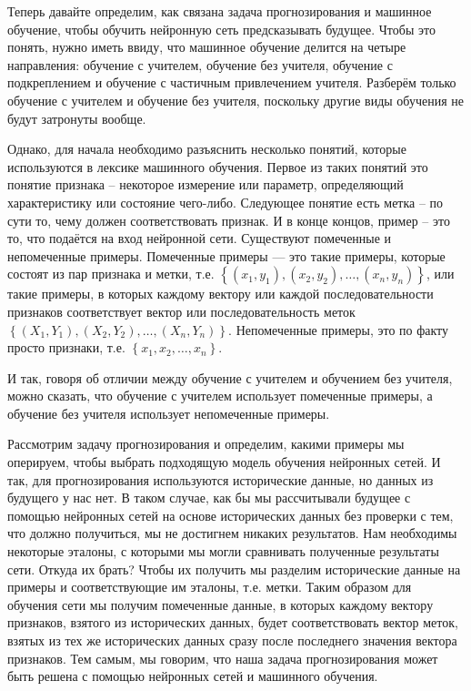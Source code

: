 {  \par Теперь давайте определим, как связана задача прогнозирования и машинное обучение, чтобы обучить нейронную сеть предсказывать будущее. Чтобы это понять, нужно иметь ввиду, что машинное обучение делится на четыре направления: обучение с учителем, обучение без учителя, обучение с подкреплением и обучение с частичным привлечением учителя. Разберём только обучение с учителем и обучение без учителя, поскольку другие виды обучения не будут затронуты вообще. 

  \par Однако, для начала необходимо разъяснить несколько понятий, которые используются в лексике машинного обучения. Первое из таких понятий это понятие признака – некоторое измерение или параметр, определяющий характеристику или состояние чего-либо. Следующее понятие есть метка – по сути то, чему должен соответствовать признак.  И в конце концов, пример – это то, что подаётся на вход нейронной сети. Существуют помеченные и непомеченные примеры. Помеченные примеры — это такие примеры, которые состоят из пар признака и метки, т.е. $\left\{\left(x_{1}, y_{1}\right), \left(x_{2}, y_{2}\right), \dots, \left(x_{n}, y_{n}\right)\right\}$, или такие примеры, в которых каждому вектору или каждой последовательности признаков соответствует вектор или последовательность меток $\left\{\left(X_{1}, Y_{1}\right), \left(X_{2}, Y_{2}\right), \dots, \left(X_{n}, Y_{n}\right)\right\}$. Непомеченные примеры, это по факту просто признаки, т.е. $\left\{x_{1}, x_{2}, \dots, x_{n}\right\}$. 

  \par И так, говоря об отличии между обучение с учителем и обучением без учителя, можно сказать, что обучение с учителем использует помеченные примеры, а обучение без учителя использует непомеченные примеры. 

  \par 	Рассмотрим задачу прогнозирования и определим, какими примеры мы оперируем, чтобы выбрать подходящую модель обучения нейронных сетей. И так, для прогнозирования используются исторические данные, но данных из будущего у нас нет. В таком случае, как бы мы рассчитывали будущее с помощью нейронных сетей на основе исторических данных без проверки с тем, что должно получиться, мы не достигнем никаких результатов. Нам необходимы некоторые эталоны, с которыми мы могли сравнивать полученные результаты сети. Откуда их брать? Чтобы их получить мы разделим исторические данные на примеры и соответствующие им эталоны, т.е. метки. Таким образом для обучения сети мы получим помеченные данные, в которых каждому вектору признаков, взятого из исторических данных, будет соответствовать вектор меток, взятых из тех же исторических данных сразу после последнего значения вектора признаков. Тем самым, мы говорим, что наша задача прогнозирования может быть решена с помощью нейронных сетей и машинного обучения.

  \par %
}


